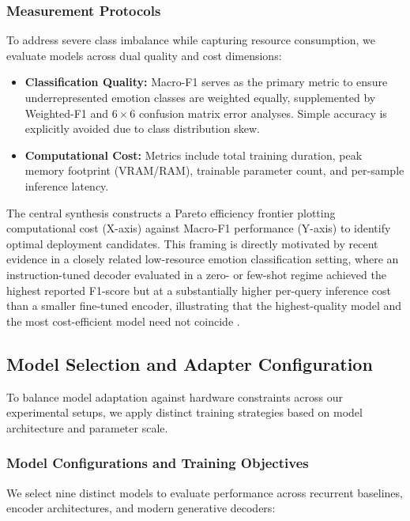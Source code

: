 \documentclass[conference]{IEEEtran}
\begin{document}
\subsubsection{Measurement Protocols}
To address severe class imbalance while capturing resource consumption, we evaluate models across dual quality and cost dimensions:
\begin{itemize}
    \item \textbf{Classification Quality:} Macro-F1 serves as the primary metric to ensure underrepresented emotion classes are weighted equally, supplemented by Weighted-F1 and $6 \times 6$ confusion matrix error analyses. Simple accuracy is explicitly avoided due to class distribution skew.
    \item \textbf{Computational Cost:} Metrics include total training duration, peak memory footprint (VRAM/RAM), trainable parameter count, and per-sample inference latency.
\end{itemize}
The central synthesis constructs a Pareto efficiency frontier plotting computational cost (X-axis) against Macro-F1 performance (Y-axis) 
to identify optimal deployment candidates. This framing is directly motivated by recent evidence in a closely related low-resource emotion classification setting, where an instruction-tuned decoder evaluated in a zero- or few-shot regime achieved the highest reported F1-score but at a substantially higher per-query inference cost than a smaller fine-tuned encoder, illustrating that the highest-quality model and the most cost-efficient model need not coincide \cite{alam2026beyond}.

\subsection{Model Selection and Adapter Configuration}

To balance model adaptation against hardware constraints across our experimental setups, we apply distinct training strategies based on model architecture and parameter scale.

\subsubsection{Model Configurations and Training Objectives}
We select nine distinct models to evaluate performance across recurrent baselines, encoder architectures, and modern generative decoders:
\end{document}
